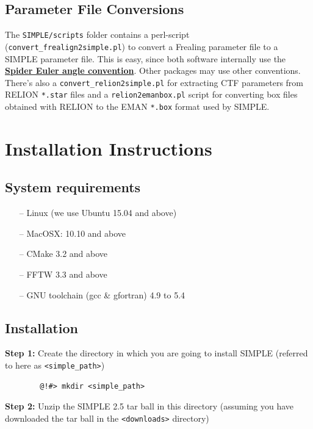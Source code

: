 \documentclass[a4paper,11pt]{article}
\begin{document}
\subsection{Parameter File Conversions}
The \texttt{SIMPLE/scripts} folder contains a perl-script (\texttt{convert\_frealign2simple.pl}) to convert a Frealing parameter file to a SIMPLE parameter file. This is easy, since both software internally use the \href{http://spider.wadsworth.org/spider_doc/spider/docs/euler.html}{\textbf{\textcolor{BurntOrange}{Spider Euler angle convention}}}. Other packages may use other conventions. There's also a \texttt{convert\_relion2simple.pl} for extracting CTF parameters from RELION \texttt{*.star} files and a \texttt{relion2emanbox.pl} script for converting box files obtained with RELION to the EMAN \texttt{*.box} format used by SIMPLE.

\section{Installation Instructions}

\subsection{System requirements}
\begin{itemize}
	\item[--] Linux (we use Ubuntu 15.04 and above)
	\item[--] MacOSX: 10.10 and above
	\item[--] CMake 3.2 and above
	\item[--] FFTW 3.3 and above
	\item[--] GNU toolchain (gcc \& gfortran) 4.9 to 5.4
\end{itemize}

\subsection{Installation}
\noindent{}\textbf{Step 1:} Create the directory in which you are going to install SIMPLE (referred to here as \texttt{<simple\_path>})

\begin{verbatim}
        @!#> mkdir <simple_path>
\end{verbatim}

\noindent{}\textbf{Step 2:} Unzip the SIMPLE 2.5 tar ball in this directory (assuming you have downloaded the tar ball in the \texttt{<downloads>} directory)
\end{document}
